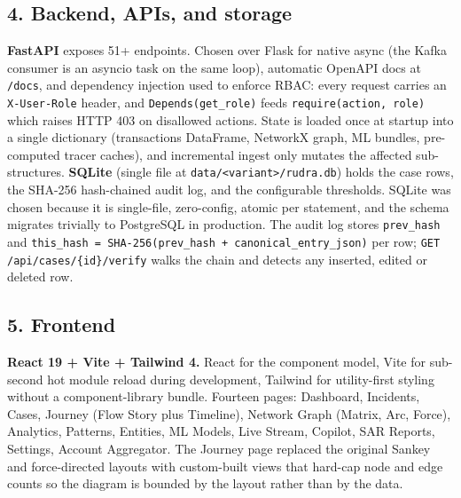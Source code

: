 \documentclass[10pt,a4paper]{article}
\begin{document}
\subsection*{4. Backend, APIs, and storage}
\textbf{FastAPI} exposes 51+ endpoints. Chosen over Flask for native async (the Kafka consumer is an asyncio task on the same loop), automatic OpenAPI docs at \texttt{/docs}, and dependency injection used to enforce RBAC: every request carries an \texttt{X-User-Role} header, and \texttt{Depends(get\_role)} feeds \texttt{require(action, role)} which raises HTTP 403 on disallowed actions. State is loaded once at startup into a single dictionary (transactions DataFrame, NetworkX graph, ML bundles, pre-computed tracer caches), and incremental ingest only mutates the affected sub-structures. \textbf{SQLite} (single file at \texttt{data/<variant>/rudra.db}) holds the case rows, the SHA-256 hash-chained audit log, and the configurable thresholds. SQLite was chosen because it is single-file, zero-config, atomic per statement, and the schema migrates trivially to PostgreSQL in production. The audit log stores \texttt{prev\_hash} and \texttt{this\_hash = SHA-256(prev\_hash + canonical\_entry\_json)} per row; \texttt{GET /api/cases/\{id\}/verify} walks the chain and detects any inserted, edited or deleted row.

\subsection*{5. Frontend}
\textbf{React 19 + Vite + Tailwind 4.} React for the component model, Vite for sub-second hot module reload during development, Tailwind for utility-first styling without a component-library bundle. Fourteen pages: Dashboard, Incidents, Cases, Journey (Flow Story plus Timeline), Network Graph (Matrix, Arc, Force), Analytics, Patterns, Entities, ML Models, Live Stream, Copilot, SAR Reports, Settings, Account Aggregator. The Journey page replaced the original Sankey and force-directed layouts with custom-built views that hard-cap node and edge counts so the diagram is bounded by the layout rather than by the data.
\end{document}
